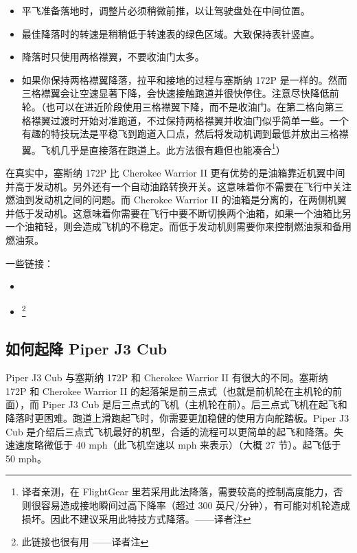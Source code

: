 \begin{itemize}
    \item 平飞准备落地时，调整片必须稍微前推，以让驾驶盘处在中间位置。
    \item 最佳降落时的转速是稍稍低于转速表的绿色区域。大致保持表针竖直。
    \item 降落时只使用两格襟翼，不要收油门太多。
    \item 如果你保持两格襟翼降落，拉平和接地的过程与塞斯纳 172P 是一样的。然而三格襟翼会让空速显著下降，会快速接触跑道并很快停住。注意尽快降低前轮。（也可以在进近阶段使用三格襟翼下降，而不是收油门。在第二格向第三格襟翼过渡时开始对准跑道，不过保持两格襟翼并收油门似乎简单一些。一个有趣的特技玩法是平稳飞到跑道入口点，然后将发动机调到最低并放出三格襟翼。飞机几乎是直接落在跑道上。此方法很有趣但也能凑合\footnote{译者亲测，在 FlightGear 里若采用此法降落，需要较高的控制高度能力，否则很容易造成接地瞬间过高下降率（超过 300 英尺/分钟），有可能对机轮造成损坏。因此不建议采用此特技方式降落。——译者注}）
\end{itemize}

在真实中，塞斯纳 172P 比 Cherokee Warrior II 更有优势的是油箱靠近机翼中间并高于发动机。另外还有一个自动油路转换开关。这意味着你不需要在飞行中关注燃油到发动机之间的问题。而 Cherokee Warrior II 的油箱是分离的，在两侧机翼并低于发动机。这意味着你需要在飞行中要不断切换两个油箱，如果一个油箱比另一个油箱轻，则会造成飞机的不稳定。而低于发动机则需要你来控制燃油泵和备用燃油泵。

一些链接：
\begin{itemize}
    \item {}
    \item {} \footnote{此链接也很有用  ——译者注}
\end{itemize}

\subsection{如何起降 Piper J3 Cub}
    \label{sec:PiperJ3}

Piper J3 Cub 与塞斯纳 172P 和 Cherokee Warrior II 有很大的不同。塞斯纳 172P 和 Cherokee Warrior II 的起落架是前三点式（也就是前机轮在主机轮的前面），而 Piper J3 Cub 是后三点式的飞机（主机轮在前）。后三点式飞机在起飞和降落时更困难。跑道上滑跑起飞时，你需要更加稳健的使用方向舵踏板。Piper J3 Cub 是介绍后三点式飞机最好的机型，合适的流程可以更简单的起飞和降落。失速速度略微低于 40 mph（此飞机空速以 mph 来表示）（大概 27 节）。起飞低于 50 mph。


